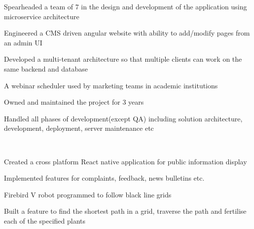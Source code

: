 \documentclass[]{deedy-resume-openfont}
\begin{document}
\begin{minipage}[t]{0.66\textwidth}
\begin{tightemize}
    \item Spearheaded a team of 7 in the design and development of the application using microservice architecture
    \item Engineered a CMS driven angular website with ability to add/modify pages from an admin UI
    \item Developed a multi-tenant architecture so that multiple clients can work on the same backend and database
\end{tightemize}
\sectionsep

\begin{tightemize}
    \item A webinar scheduler used by marketing teams in academic institutions
    \item Owned and maintained the project for 3 years
    \item Handled all phases of development(except QA) including solution architecture, development, deployment, server maintenance etc
\end{tightemize}
\sectionsep

\\
\begin{tightemize}
    \item Created a cross platform React native application for public information display
    \item Implemented features for complaints, feedback, news bulletins etc.
\end{tightemize}
\sectionsep

\begin{tightemize}
    \item Firebird V robot programmed to follow black line grids
    \item Built a feature to find the shortest path in a grid, traverse the path and fertilise each of the specified plants
\end{tightemize}
\sectionsep



\end{minipage}
\end{document}
